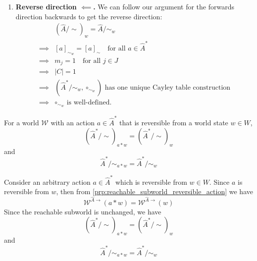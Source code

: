 \begin{proofE}
\begin{enumerate}
    \item \textbf{Reverse direction $\impliedby$.}
    We can follow our argument for the forwards direction backwards to get the reverse direction:
    \begin{align}
        & (\hat{A}/\sim)_{w} = \hat{A}/\sim_{w} \\
        \implies & [a]_{\sim_{w}} = [a]_{\sim} \quad \text{for all $a \in \hat{A}^{*}$} \\
        \implies & m_{j} = 1 \quad \text{for all $j \in J$} \\
        \implies & |C| = 1 \\
        \implies & \text{$( \hat{A}^{*}/\sim_{w}, \circ_{\sim_{w}})$ has one unique Cayley table construction} \\
        \implies & \text{$\circ_{\sim_{w}}$ is well-defined.}
    \end{align}
\end{enumerate}
\end{proofE}


\begin{propositionE}
    For a world $\mathscr{W}$ with an action $a \in \hat{A}^{*}$ that is reversible from a world state $w \in W$,
    \begin{equation}
        (\hat{A}^{*}/\sim)_{a \ast w} = (\hat{A}^{*}/\sim)_{w}
    \end{equation}
    and
    \begin{equation}
        \hat{A}^{*}/\sim_{a \ast w} = \hat{A}^{*}/\sim_{w}
    \end{equation}
\end{propositionE}
\begin{proofE}
    Consider an arbitrary action $a \in \hat{A}^{*}$ which is reversible from $w \in W$.
    Since $a$ is reversible from $w$, then from \cref{prp:reachable_subworld_reversible_action} we have
    \begin{equation}
        \mathscr{W}^{\hat{A}\to}(a \ast w) = \mathscr{W}^{\hat{A}\to}(w)
    \end{equation}
    Since the reachable subworld is unchanged, we have
    \begin{equation}
        (\hat{A}^{*}/\sim)_{a \ast w} = (\hat{A}^{*}/\sim)_{w}
    \end{equation}
    and
    \begin{equation}
        \hat{A}^{*}/\sim_{a \ast w} = \hat{A}^{*}/\sim_{w}
    \end{equation}
\end{proofE}



